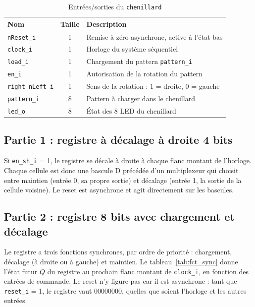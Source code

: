 \begin{table}[H]
  \centering
  \small
  \begin{tabular}{l c p{9.5cm}}
    \hline
    \textbf{Nom} & \textbf{Taille} & \textbf{Description} \\
    \hline
    \texttt{nReset\_i} & 1 & Remise à zéro asynchrone, active à l'état bas \\
    \texttt{clock\_i}  & 1 & Horloge du système séquentiel \\
    \texttt{load\_i}   & 1 & Chargement du pattern \texttt{pattern\_i} \\
    \texttt{en\_i}     & 1 & Autorisation de la rotation du pattern \\
    \texttt{right\_nLeft\_i} & 1 & Sens de la rotation : 1 = droite, 0 = gauche \\
    \texttt{pattern\_i} & 8 & Pattern à charger dans le chenillard \\
    \texttt{led\_o}    & 8 & État des 8 LED du chenillard \\
    \hline
  \end{tabular}
  \caption{Entrées/sorties du \texttt{chenillard}}
  \label{tab:io_p3}
\end{table}


\subsection{Partie 1 : registre à décalage à droite 4 bits}

Si \texttt{en\_sh\_i} = 1, le registre se décale à droite à chaque flanc montant de l'horloge. Chaque cellule est donc une bascule D précédée d'un multiplexeur qui choisit entre maintien (entrée 0, sa propre sortie) et décalage (entrée 1, la sortie de la cellule voisine). Le reset est asynchrone et agit directement sur les bascules.


\subsection{Partie 2 : registre 8 bits avec chargement et décalage}

Le registre a trois fonctions synchrones, par ordre de priorité : chargement, décalage (à droite ou à gauche) et maintien. Le tableau~\ref{tab:fct_sync} donne l'état futur $Q$ du registre au prochain flanc montant de \texttt{clock\_i}, en fonction des entrées de commande. Le reset n'y figure pas car il est asynchrone : tant que \texttt{reset\_i} = 1, le registre vaut 00000000, quelles que soient l'horloge et les autres entrées.

